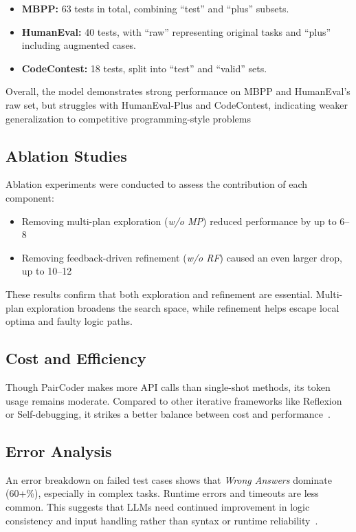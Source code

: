 \documentclass[11pt,a4paper]{article}
\begin{document}
\begin{itemize}
  \item \textbf{MBPP:} 63 tests in total, combining “test” and “plus” subsets.
  \item \textbf{HumanEval:} 40 tests, with “raw” representing original tasks and “plus” including augmented cases.
  \item \textbf{CodeContest:} 18 tests, split into “test” and “valid” sets.
\end{itemize}

\noindent
Overall, the model demonstrates strong performance on MBPP and HumanEval’s raw set, but 
struggles with HumanEval-Plus and CodeContest, indicating weaker generalization to 
competitive programming-style problems


\subsection{Ablation Studies}
Ablation experiments were conducted to assess the contribution of each component:
\begin{itemize}
\item Removing multi-plan exploration (\textit{w/o MP}) reduced performance by up to 6–8%
\item Removing feedback-driven refinement (\textit{w/o RF}) caused an even larger drop, up to 10–12%
\end{itemize}

These results confirm that both exploration and refinement are essential. Multi-plan exploration broadens the search space, while refinement helps escape local optima and faulty logic paths.

\subsection{Cost and Efficiency}
Though PairCoder makes more API calls than single-shot methods, its token usage remains moderate. Compared to other iterative frameworks like Reflexion or Self-debugging, it strikes a better balance between cost and performance~\cite{zhang2024paircoder}.

\subsection{Error Analysis}
An error breakdown on failed test cases shows that \textit{Wrong Answers} dominate (60+\%), especially in complex tasks. Runtime errors and timeouts are less common. This suggests that LLMs need continued improvement in logic consistency and input handling rather than syntax or runtime reliability~\cite{zhang2024paircoder}.
\end{document}
